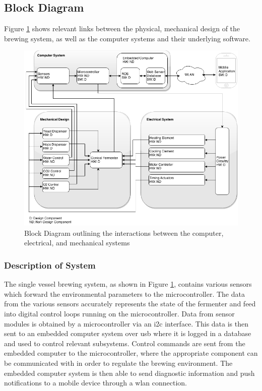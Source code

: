 \documentclass{article}
\begin{document}
\subsection{Block Diagram}
Figure \ref{fig:block} shows relevant links between the physical, mechanical design of the brewing system, as well as the computer systems and their underlying software.

\begin{figure}[H]
\begin{center}
\includegraphics[scale=0.58]{block-diagram.png}
\caption{Block Diagram outlining the interactions between the computer, electrical, and mechanical systems}
\label{fig:block}
\end{center}
\end{figure}

\subsubsection{Description of System}
The single vessel brewing system, as shown in Figure \ref{fig:block}, contains various sensors which forward the environmental parameters to the microcontroller. The data from the various sensors accurately represents the state of the fermenter and feed into digital control loops running on the microcontroller.  Data from sensor modules is obtained by a microcontroller via an \gls{i2c} interface. This data is then sent to an embedded computer system over \gls{usb} where it is logged in a database and used to control relevant subsystems. Control commands are sent from the embedded computer to the microcontroller, where the appropriate component can be communicated with in order to regulate the brewing environment.  The embedded computer system is then able to send diagnostic information and push notifications to a mobile device through a \gls{wlan} connection.
\end{document}
